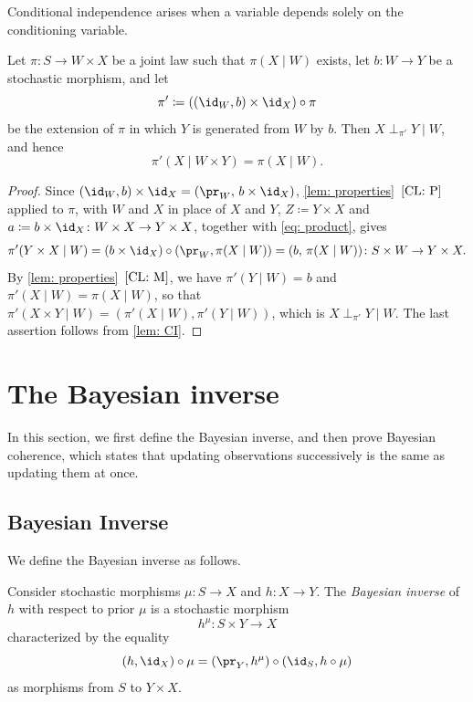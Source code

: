 \documentclass[12pt,reqno]{amsart}%
\theoremstyle{plain}
\theoremstyle{definition}
\begin{document}
Conditional independence arises when a variable depends solely on the conditioning variable.

\begin{corollary}\label{cor: CI}
	Let $\pi\colon S\rightarrow W\times X$ be a joint law such that $\pi(X\mid W)$ exists,
	let $b\colon W\rightarrow Y$ be a stochastic morphism, and let
	\[
		\pi'\coloneqq ((\id_W,b)\times \id_X)\circ\pi
	\]
	be the extension of $\pi$ in which $Y$ is generated from $W$ by $b$.
	Then $X\perp_{\pi'} Y\mid W$, and hence
	\[
		\pi'(X\mid W\times Y)=\pi(X\mid W).
	\]
\end{corollary}

\begin{proof}
	Since $(\id_W,b)\times\id_X=(\pr_W,\,b\times\id_X)$, \cref{lem: properties}~$\ref{CL: P}$ applied to $\pi$,
	with $W$ and $X$ in place of $X$ and $Y$, $Z\coloneqq Y\times X$ and
	$a\coloneqq b\times\id_X\colon W\times X\rightarrow Y\times X$, together with \eqref{eq: product}, gives
	\[
		\pi'(Y\times X\mid W)=(b\times\id_X)\circ(\pr_W,\pi(X\mid W))=(b,\,\pi(X\mid W))\colon S\times W\rightarrow Y\times X.
	\]
	By \cref{lem: properties}~$\ref{CL: M}$, we have $\pi'(Y\mid W)=b$ and $\pi'(X\mid W)=\pi(X\mid W)$,
	so that $\pi'(X\times Y\mid W)=(\pi'(X\mid W),\pi'(Y\mid W))$, which is $X\perp_{\pi'}Y\mid W$.
	The last assertion follows from \cref{lem: CI}.
\end{proof}

%
%
%
\section{The Bayesian inverse}\label{sec: BI}
%
%
%

In this section, we first define the Bayesian inverse, and then prove Bayesian coherence,
which states that updating observations successively is the same as updating them at once.

%
\subsection{Bayesian Inverse}
%

We define the Bayesian inverse as follows.

\begin{definition}\label{def: BI}
	Consider stochastic morphisms $\mu\colon S\rightarrow X$ and $h\colon X\rightarrow Y$.
	The \emph{Bayesian inverse} of $h$ with respect to prior $\mu$ is a stochastic morphism
	\[
		h^\mu\colon S\times Y\rightarrow X
	\]
	characterized by the equality
	\begin{equation}\label{eq: BI}
			(h,\id_X)\circ\mu=(\pr_Y,h^\mu)\circ (\id_S, h\circ \mu)
	\end{equation}
	as morphisms from $S$ to $Y\times X$.
\end{definition}
\end{document}
